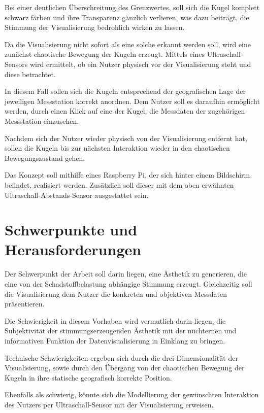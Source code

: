 \documentclass[12pt]{article} %
\begin{document}
Bei einer deutlichen Überschreitung des Grenzwertes, soll sich die Kugel komplett schwarz färben und ihre Transparenz gänzlich verlieren, was dazu beiträgt, die Stimmung der Visualisierung bedrohlich wirken zu lassen.

Da die Visualisierung nicht sofort als eine solche erkannt werden soll, wird eine zunächst chaotische Bewegung der Kugeln erzeugt.
Mittels eines Ultraschall-Sensors wird ermittelt, ob ein Nutzer physisch vor der Visualisierung steht und diese betrachtet.

In diesem Fall sollen sich die Kugeln entsprechend der geografischen Lage der jeweiligen Messstation korrekt anordnen.
Dem Nutzer soll es daraufhin ermöglicht werden, durch einen Klick auf eine der Kugel, die Messdaten der zugehörigen Messstation einzusehen.

Nachdem sich der Nutzer wieder physisch von der Visualisierung entfernt hat, sollen die Kugeln bis zur nächsten Interaktion wieder in den chaotischen Bewegungszustand gehen.  

Das Konzept soll mithilfe eines Raspberry Pi, der sich hinter einem Bildschirm befindet, realisiert werden.
Zusätzlich soll dieser mit dem oben erwähnten Ultraschall-Abstands-Sensor ausgestattet sein. 


\section{Schwerpunkte und Herausforderungen} \label{sec:Schwerpunkte}

Der Schwerpunkt der Arbeit soll darin liegen, eine Ästhetik zu generieren, die eine von der Schadstoffbelastung abhängige Stimmung erzeugt.
Gleichzeitig soll die Visualisierung dem Nutzer die konkreten und objektiven Messdaten präsentieren.  

Die Schwierigkeit in diesem Vorhaben wird vermutlich darin liegen, die Subjektivität der stimmungserzeugenden Ästhetik mit der nüchternen und informativen Funktion der Datenvisualisierung in Einklang zu bringen.

Technische Schwierigkeiten ergeben sich durch die drei Dimensionalität der Visualisierung, sowie durch den Übergang von der chaotischen Bewegung der Kugeln in ihre statische geografisch korrekte Position.

Ebenfalls als schwierig, könnte sich die Modellierung der gewünschten Interaktion des Nutzers per Ultraschall-Sensor mit der Visualisierung erweisen.
\end{document}
